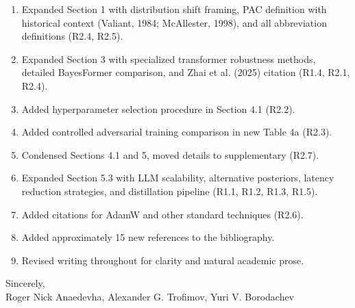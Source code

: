 \documentclass[12pt,a4paper]{article}
\begin{document}
\begin{enumerate}
\item Expanded Section 1 with distribution shift framing, PAC definition with historical context (Valiant, 1984; McAllester, 1998), and all abbreviation definitions (R2.4, R2.5).

\item Expanded Section 3 with specialized transformer robustness methods, detailed BayesFormer comparison, and Zhai et al. (2025) citation (R1.4, R2.1, R2.4).

\item Added hyperparameter selection procedure in Section 4.1 (R2.2).

\item Added controlled adversarial training comparison in new Table 4a (R2.3).

\item Condensed Sections 4.1 and 5, moved details to supplementary (R2.7).

\item Expanded Section 5.3 with LLM scalability, alternative posteriors, latency reduction strategies, and distillation pipeline (R1.1, R1.2, R1.3, R1.5).

\item Added citations for AdamW and other standard techniques (R2.6).

\item Added approximately 15 new references to the bibliography.

\item Revised writing throughout for clarity and natural academic prose.
\end{enumerate}

\bigskip
\noindent Sincerely,\\
Roger Nick Anaedevha, Alexander G. Trofimov, Yuri V. Borodachev
\end{document}
